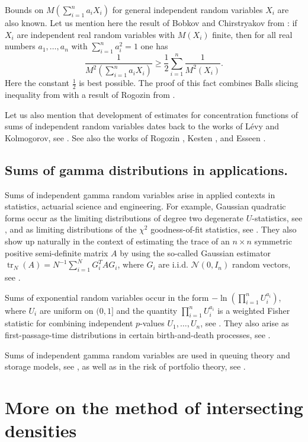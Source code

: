 \documentclass[11pt]{amsart}
\newcommand{\mc}[1]{\mathcal{{#1}}}
\newcommand{\1}{\mathbf{1}}
\DeclareMathOperator{\tr}{tr}
\theoremstyle{definition}
\theoremstyle{definition}
\theoremstyle{remark}
\begin{document}
Bounds on $M(\sum_{i=1}^n a_i X_i)$ for general independent random variables $X_i$ are also known. Let us mention here the result of Bobkov and Chirstryakov from \cite{BC14}: if $X_i$ are independent real random variables with  $M(X_i)$ finite, then for all real numbers $a_1, \ldots, a_n$ with $\sum_{i=1}^n a_i^2=1$ one has
\[
	\frac{1}{M^2(\sum_{i=1}^n a_i X_i)} \geq \frac12 \sum_{i=1}^n \frac{1}{M^2(X_i)}.
\] 
Here the constant $\frac12$ is best possible. The proof of this fact combines Balls slicing inequality from \cite{B86-ball} with a result of Rogozin from \cite{R87}.

Let us also mention that development of estimates for concentration functions of sums of independent random variables dates back to the works of Lévy and Kolmogorov, see \cite{L37,K60}. See also the works of Rogozin \cite{R61-1,R61-2}, Kesten \cite{K69}, and Esseen \cite{E68}. 

\subsection{Sums of gamma distributions in applications.}
Sums of independent gamma random variables arise in applied contexts in statistics, actuarial science and engineering. For example, Gaussian quadratic forms occur as the limiting distributions of degree two degenerate $U$-statistics, see \cite{G77,S80,ACF82}, and as limiting distributions of the $\chi^2$ goodness-of-fit statistics, see \cite{CL54, M78}. They also show up naturally in the context of estimating the trace of an $n \times n$ symmetric positive semi-definite matrix $A$ by using the so-called Gaussian estimator $\tr_N(A) = N^{-1}\sum_{i=1}^N G_i^T A G_i$, where $G_i$ are i.i.d. $\mc{N}(0,I_n)$ random vectors, see \cite{RS15}.  

Sums of exponential random variables occur in the form $-\ln(\prod_{i=1}^n U_i^{a_i})$, where $U_i$ are uniform on $(0,1]$ and the quantity $\prod_{i=1}^n U_i^{a_i}$ is a weighted Fisher statistic for combining independent $p$-values $U_1,\ldots, U_n$, see \cite{G55}. They also arise as first-passage-time distributions in certain birth-and-death processes, see \cite{F71,BS87}.  

Sums of independent gamma random variables are used in queuing theory and storage models, see \cite{Pr65}, as well as in the risk of portfolio theory, see \cite{H01}.   

\vspace{0.3cm}


\section{More on the method of intersecting densities}\label{sec:method}
\end{document}
